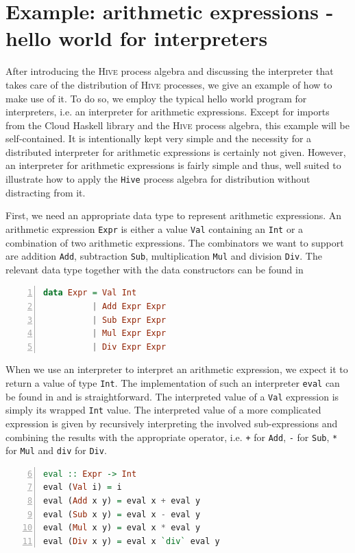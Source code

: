 \section{Example: arithmetic expressions - hello world for interpreters}
\label{chp:example}
After introducing the \textsc{Hive} process algebra and discussing the interpreter that takes care of the distribution of \textsc{Hive} processes, we give an example of how to make use of it. To do so, we employ the typical hello world program for interpreters, i.e. an interpreter for arithmetic expressions. Except for imports from the \textsf{Cloud Haskell} library and the \textsc{Hive} process algebra, this example will be self-contained. It is intentionally kept very simple and the necessity for a distributed interpreter for arithmetic expressions is certainly not given. However, an interpreter for arithmetic expressions is fairly simple and thus, well suited to illustrate how to apply the \texttt{Hive} process algebra for distribution without distracting from it.

First, we need an appropriate data type to represent arithmetic expressions. An arithmetic expression \texttt{Expr} is either a value \texttt{Val} containing an \texttt{Int} or a combination of two arithmetic expressions. The combinators we want to support are addition \texttt{Add}, subtraction \texttt{Sub}, multiplication \texttt{Mul} and division \texttt{Div}. The relevant data type together with the data constructors can be found in  
\begin{lstlisting}[language=Haskell, caption=Data model for the representation of arithmetic expressions., label=lst:arith_model, numbers=left, frame=bt]
data Expr = Val Int
          | Add Expr Expr
          | Sub Expr Expr
          | Mul Expr Expr
          | Div Expr Expr
\end{lstlisting}

When we use an interpreter to interpret an arithmetic expression, we expect it to return a value of type \texttt{Int}. The implementation of such an interpreter \texttt{eval} can be found in  and is straightforward. The interpreted value of a \texttt{Val} expression is simply its wrapped \texttt{Int} value. The interpreted value of a more complicated expression is given by recursively interpreting the involved sub-expressions and combining the results with the appropriate operator, i.e. \texttt{+} for \texttt{Add}, \texttt{-} for \texttt{Sub}, \texttt{*} for \texttt{Mul} and \texttt{div} for \texttt{Div}.
\begin{lstlisting}[language=Haskell, caption=Implementation of an interpreter for arithmetic expressions of type \texttt{Expr}., label=lst:arith_eval, numbers=left, frame=bt, firstnumber=6]
eval :: Expr -> Int
eval (Val i) = i
eval (Add x y) = eval x + eval y
eval (Sub x y) = eval x - eval y
eval (Mul x y) = eval x * eval y
eval (Div x y) = eval x `div` eval y
\end{lstlisting}

